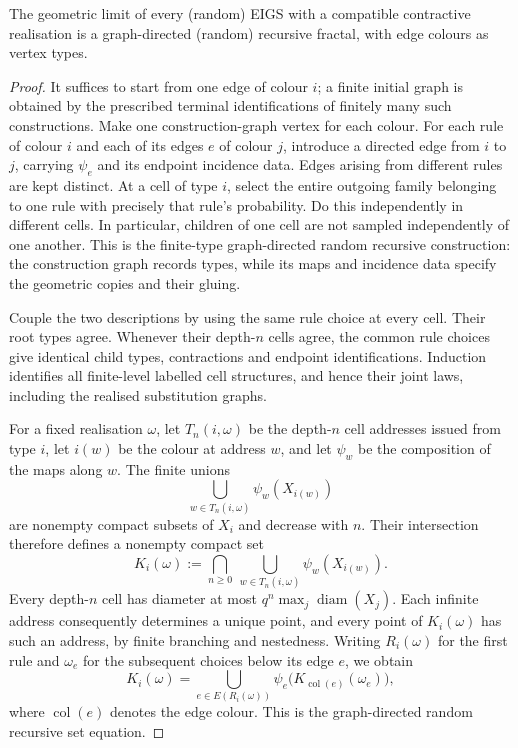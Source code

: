 \begin{theorem}\label{thm:eigs-graph-directed}
The geometric limit of every (random) EIGS with a compatible contractive realisation is a graph-directed (random) recursive fractal, with edge colours as vertex types.
\end{theorem}
\begin{proof}
It suffices to start from one edge of colour $i$; a finite initial graph is obtained by the prescribed terminal identifications of finitely many such constructions.
Make one construction-graph vertex for each colour.
For each rule of colour $i$ and each of its edges $e$ of colour $j$, introduce a directed edge from $i$ to $j$, carrying $\psi_e$ and its endpoint incidence data.
Edges arising from different rules are kept distinct.
At a cell of type $i$, select the entire outgoing family belonging to one rule with precisely that rule's probability.
Do this independently in different cells.
In particular, children of one cell are not sampled independently of one another.
This is the finite-type graph-directed random recursive construction: the construction graph records types, while its maps and incidence data specify the geometric copies and their gluing.

Couple the two descriptions by using the same rule choice at every cell.
Their root types agree.
Whenever their depth-$n$ cells agree, the common rule choices give identical child types, contractions and endpoint identifications.
Induction identifies all finite-level labelled cell structures, and hence their joint laws, including the realised substitution graphs.

For a fixed realisation $\omega$, let $T_n(i,\omega)$ be the depth-$n$ cell addresses issued from type $i$, let $i(w)$ be the colour at address $w$, and let $\psi_w$ be the composition of the maps along $w$.
The finite unions
\[
 \bigcup_{w\in T_n(i,\omega)}\psi_w(X_{i(w)})
\]
are nonempty compact subsets of $X_i$ and decrease with $n$.
Their intersection therefore defines a nonempty compact set
\[
 K_i(\omega):=
 \bigcap_{n\ge0}\ \bigcup_{w\in T_n(i,\omega)}
       \psi_w(X_{i(w)}).
\]
Every depth-$n$ cell has diameter at most $q^n\max_j\operatorname{diam}(X_j)$.
Each infinite address consequently determines a unique point, and every point of $K_i(\omega)$ has such an address, by finite branching and nestedness.
Writing $R_i(\omega)$ for the first rule and $\omega_e$ for the subsequent choices below its edge $e$, we obtain
\[
 K_i(\omega)=
 \bigcup_{e\in E(R_i(\omega))}
       \psi_e\bigl(K_{\operatorname{col}(e)}(\omega_e)\bigr),
\]
where $\operatorname{col}(e)$ denotes the edge colour.
This is the graph-directed random recursive set equation.


\end{proof}
